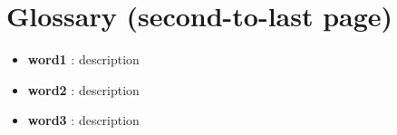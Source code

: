 \chapter{Glossary (second-to-last page)}
\begin{itemize}
    \item \textbf{word1} : description
    \vspace{1.2em}
    \item \textbf{word2} : description
    \vspace{1.2em}
    \item \textbf{word3} : description
    \vspace{1.2em}
\end{itemize}
